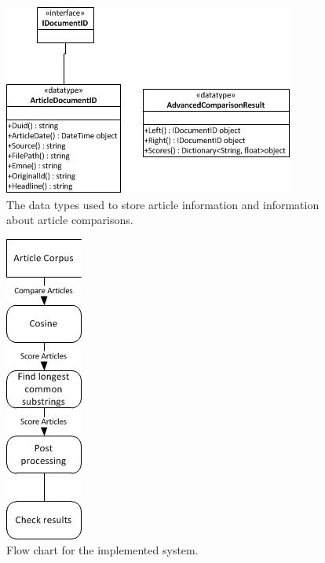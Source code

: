 \begin{figure}[h]
	\centering
	\includegraphics[scale=0.7]{figures/Datatypes}
	\caption{The data types used to store article information and information about article comparisons.}
	\label{Datatypes}
\end{figure}


\begin{figure}
	\centering
	\includegraphics[scale=1.0]{figures/Dataflow}
	\caption{Flow chart for the implemented system.}
	\label{Dataflow}
\end{figure}




